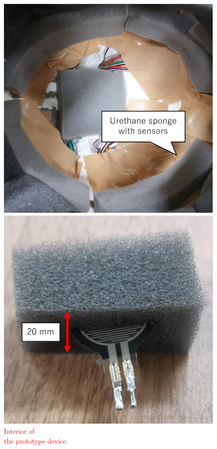\documentclass[english,preprint,JIP]{ipsj}
\begin{document}
\begin{figure}[!t]
\begin{minipage}{0.48\hsize}
\begin{center}
        \includegraphics[width=1\linewidth]{figure/met_in.eps}
  \end{center}
  \caption{\textcolor{red}{Interior of}\\\textcolor{red}{the prototype device.}}
  \label{fig:met_in}
  \end{minipage}
\begin{minipage}{0.48\hsize}
\begin{center}
        \includegraphics[width=1\linewidth]{figure/sensor.eps}

\end{center}
\end{minipage}
\end{figure}
\end{document}
